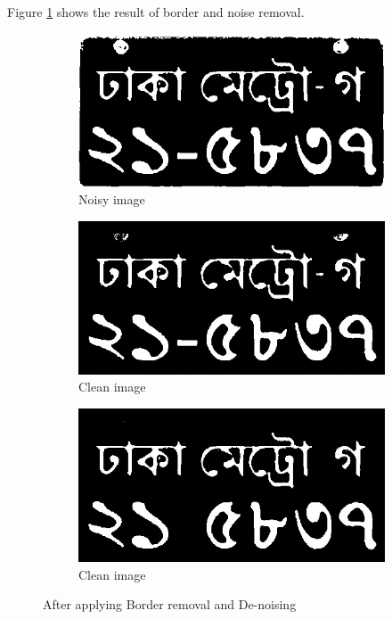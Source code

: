 \documentclass{standalone}
\begin{document}
Figure \ref{fig:CleaningStage} shows the result of border and noise removal.
\begin{figure}
\begin{subfigure}{.5\textwidth}
  \centering
  \includegraphics[width=.8\linewidth]{./img/sample/stage11.jpg}
  \caption{Noisy image}
\end{subfigure}
\begin{subfigure}{.5\textwidth}
  \centering
  \includegraphics[width=.8\linewidth]{./img/sample/stage12.jpg}
  \caption{Clean image}
\end{subfigure}
\begin{subfigure}{0.9\textwidth}
  \centering
  \includegraphics[width=.8\linewidth]{./img/sample/stage13.jpg}
  \caption{Clean image}
\end{subfigure}
\caption{After applying Border removal and De-noising}
\label{fig:CleaningStage}
\end{figure}
\end{document}
